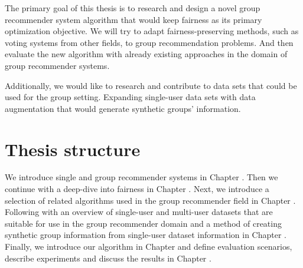 The primary goal of this thesis is to research and design a novel group recommender system algorithm that would keep fairness as its primary optimization objective. We will try to adapt fairness-preserving methods, such as voting systems from other fields, to group recommendation problems. And then evaluate the new algorithm with already existing approaches in the domain of group recommender systems.

Additionally, we would like to research and contribute to data sets that could be used for the group setting. Expanding single-user data sets with data augmentation that would generate synthetic groups' information.

\section{Thesis structure}

We introduce single and group recommender systems in Chapter . Then we continue with a deep-dive into fairness in Chapter . Next, we introduce a selection of related algorithms used in the group recommender field in Chapter . Following with an overview of single-user and multi-user datasets that are suitable for use in the group recommender domain and a method of creating synthetic group information from single-user dataset information in Chapter . Finally, we introduce our algorithm in Chapter  and define evaluation scenarios, describe experiments and discuss the results in Chapter .
